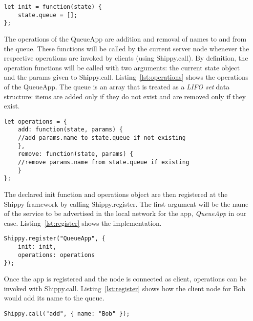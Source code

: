 \begin{lstlisting}[caption={QueueApp init function},label={lst:init}]
let init = function(state) {
    state.queue = [];
};
\end{lstlisting}

The operations of the QueueApp are addition and removal of names to and from the queue.
These functions will be called by the current server node whenever the respective operations are invoked by clients (using {\ttfamily Shippy.call}).
By definition, the operation functions will be called with two arguments: the current {\ttfamily state} object and the {\ttfamily params} given to {\ttfamily Shippy.call}.
Listing~\ref{lst:operations} shows the operations of the QueueApp.
The queue is an array that is treated as a \textit{LIFO set} data structure: items are added only if they do not exist and are removed only if they exist.

\begin{lstlisting}[caption={QueueApp operations},label={lst:operations}]
let operations = {
    add: function(state, params) {
    //add params.name to state.queue if not existing
    },
    remove: function(state, params) {
    //remove params.name from state.queue if existing
    }
};
\end{lstlisting}

The declared {\ttfamily init} function and {\ttfamily operations} object are then registered at the Shippy framework by calling {\ttfamily Shippy.register}.
The first argument will be the name of the service to be advertised in the local network for the app, \textit{QueueApp} in our case.
Listing~\ref{lst:register} shows the implementation.

\begin{lstlisting}[caption={Shippy.register},label={lst:register}]
Shippy.register("QueueApp", {
    init: init,
    operations: operations
});
\end{lstlisting}

Once the app is registered and the node is connected as client, operations can be invoked with {\ttfamily Shippy.call}. Listing~\ref{lst:register} shows how the client node for Bob would add its name to the queue.
\begin{lstlisting}[caption={Shippy.call},label={lst:call}]
Shippy.call("add", { name: "Bob" });
\end{lstlisting}

